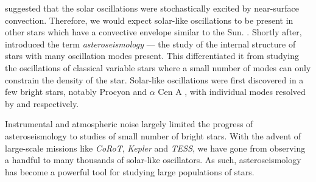\citep{Goldreich.Keeley1977} suggested that the solar oscillations were stochastically excited by near-surface convection. Therefore, we would expect solar-like oscillations to be present in other stars which have a convective envelope similar to the Sun. . Shortly after, \citet{Christensen-Dalsgaard1984} introduced the term \emph{asteroseismology} --- the study of the internal structure of stars with many oscillation modes present. This differentiated it from studying the oscillations of classical variable stars where a small number of modes can only constrain the density of the star. Solar-like oscillations were first discovered in a few bright stars, notably Procyon and \(\alpha\) Cen A \citep{Gelly.Grec.ea1986}, with individual modes resolved by \citet{Martic.Schmitt.ea1999} and \citet{Bouchy.Carrier2001} respectively.


Instrumental and atmospheric noise largely limited the progress of asteroseismology to studies of small number of bright stars. With the advent of large-scale missions like \emph{CoRoT}, \emph{Kepler} and \emph{TESS}, we have gone from observing a handful to many thousands of solar-like oscillators. As such, asteroseismology has become a powerful tool for studying large populations of stars.

